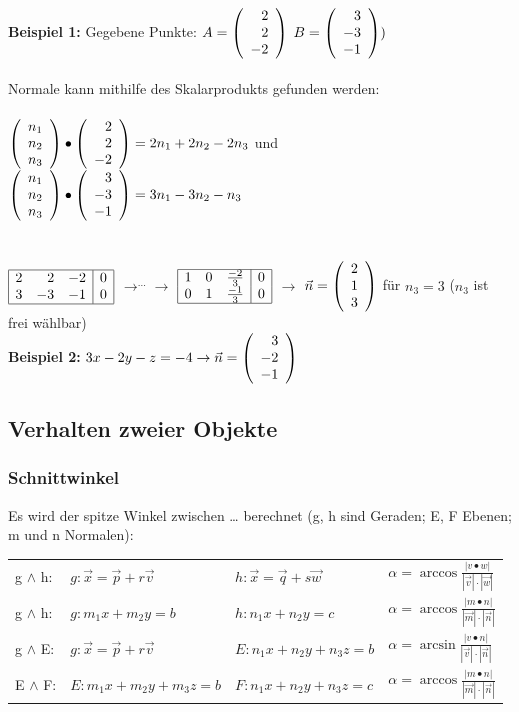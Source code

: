 		\textbf{Beispiel 1:} Gegebene Punkte: $A=\left(\begin{array}{r} 2 \\ 2 \\ -2 \\ \end{array}\right)$
									 $B=\left(\begin{array}{r} 3 \\ -3 \\ -1 \\ \end{array}\right))$ \\ \ \\
							 Normale kann mithilfe des Skalarprodukts gefunden werden: \\ \ \\
									 $\left(\begin{array}{r} n_1 \\ n_2 \\ n_3 \\ \end{array}\right)\bullet\left(\begin{array}{r} 2 \\ 2 \\ -2 \\ \end{array}\right)=2n_1+2n_2-2n_3$ und
									 $\left(\begin{array}{r} n_1 \\ n_2 \\ n_3 \\ \end{array}\right)\bullet\left(\begin{array}{r} 3 \\ -3 \\ -1 \\ \end{array}\right)=3n_1-3n_2-n_3$\\ \ \\ \ \\
							$\begin{array}{|rrr|r|}
								\hline 
									2 & 2 & -2 & 0 \\
									3 & -3 & -1 & 0 \\
								\hline
							\end{array}$
							$\rightarrow^{...}\rightarrow$	
							$\begin{array}{|rrr|r|}
								\hline 
									1 & 0 & \frac{-2}{3} & 0 \\
									0 & 1 & \frac{-1}{3} & 0 \\
								\hline
							\end{array}$
							$\rightarrow$
							$\vec{n}=\left(\begin{array}{r} 2 \\ 1 \\ 3 \\ \end{array}\right)$ für $n_3 = 3$ ($n_3$ ist frei wählbar)\\
	 \textbf{Beispiel 2:} $3x-2y-z=-4\rightarrow\vec{n}=\left(\begin{array}{r} 3 \\ -2 \\ -1 \\ \end{array}\right)$
		
\subsection{Verhalten zweier Objekte}
	\subsubsection{Schnittwinkel}
		Es wird der spitze Winkel zwischen \ldots{ }berechnet (g, h sind Geraden; E, F Ebenen; m und n Normalen):\\
		\begin{tabular}{llll}
		g $\wedge$ h:
		&$g: \vec{x}=\vec{p}+r\vec{v}$ 
		&$h: \vec{x}=\vec{q}+s\vec{w}$ 
		&$\alpha=\arccos{\frac{|v\bullet w|}{|\vec{v}|\cdot|\vec{w}|}}$\\
		g $\wedge$ h:
		&$g: m_1x+m_2y=b$
		&$h: n_1x+n_2y=c$
		&$\alpha=\arccos{\frac{|m\bullet n|}{|\vec{m}|\cdot|\vec{n}|}}$\\
		g $\wedge$ E:
		&$g: \vec{x}=\vec{p}+r\vec{v}$
		&$E: n_1x+n_2y+n_3z=b$
		&$\alpha=\arcsin{\frac{|v\bullet n|}{|\vec{v}|\cdot|\vec{n}|}}$\\
		E $\wedge$ F:
		&$E: m_1x+m_2y+m_3z=b$
		&$F: n_1x+n_2y+n_3z=c$
		&$\alpha=\arccos{\frac{|m\bullet n|}{|\vec{m}|\cdot|\vec{n}|}}$\\
		\end{tabular}

